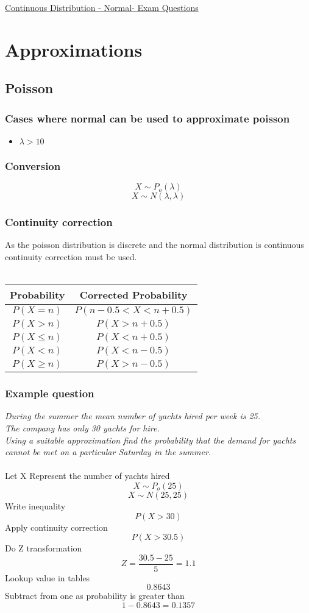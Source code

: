 \documentclass{article}[18pt]
\begin{document}
\begin{center}
\underline{\huge Continuous Distribution - Normal- Exam Questions}
\end{center}
\section{Approximations}
\subsection{Poisson}
\subsubsection{Cases where normal can be used to approximate poisson}
\begin{itemize}
\item $\lambda>10$
\end{itemize}
\subsubsection{Conversion}
$$X\sim P_o(\lambda)$$
$$X\sim N(\lambda,\lambda)$$
\subsubsection{Continuity correction}
As the poisson distribution is discrete and the normal distribution is continuous continuity correction must be used.\\
\\
{\renewcommand{\arraystretch}{1.5}
\begin{tabular}{|c|c|}
\hline
Probability&Corrected Probability\\
\hline
$P(X=n)$&$P(n-0.5<X<n+0.5)$\\
\hline
$P(X>n)$&$P(X>n+0.5)$\\
\hline
$P(X\leqslant n)$ &$P(X<n+0.5)$\\
\hline
$P(X<n)$&$P(X<n-0.5)$\\
\hline
$P(X\geqslant n)$&$P(X>n-0.5)$\\
\hline
\end{tabular}}
\subsubsection{Example question}
\textit{During the summer the mean number of yachts hired per week is 25.}\\
\textit{The company has only 30 yachts for hire.}\\
\textit{Using a suitable approximation find the probability that the demand for yachts cannot be
met on a particular Saturday in the summer.}\\
\\
Let X Represent the number of yachts hired
$$X\sim P_o(25)$$
$$X\sim N(25,25)$$
Write inequality
$$P(X>30)$$
Apply continuity correction
$$P(X>30.5)$$
Do Z transformation
$$Z=\frac{30.5-25}{5}=1.1$$
Lookup value in tables
$$0.8643$$
Subtract from one as probability is greater than
$$1-0.8643=0.1357$$
\newpage
\end{document}
